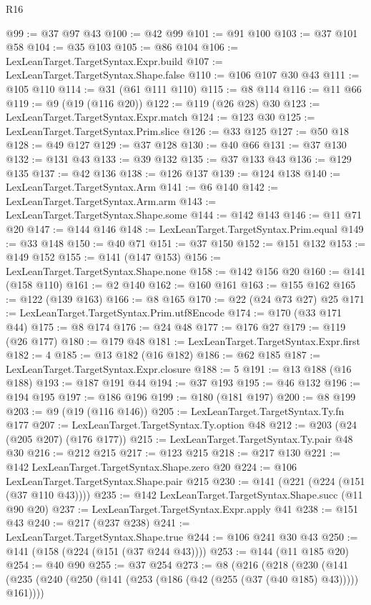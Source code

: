 \begin{lexlean}{R16}
\begin{coremodule}
@99 := @37 @97 @43
@100 := @42 @99
@101 := @91 @100
@103 := @37 @101 @58
@104 := @35 @103
@105 := @86 @104
@106 := LexLeanTarget.TargetSyntax.Expr.build
@107 := LexLeanTarget.TargetSyntax.Shape.false
@110 := @106 @107 @30 @43
@111 := @105 @110
@114 := @31 (@61 @111 @110)
@115 := @8 @114
@116 := @11 @66
@119 := @9 (@19 (@116 @20))
@122 := @119 (@26 @28) @30
@123 := LexLeanTarget.TargetSyntax.Expr.match
@124 := @123 @30
@125 := LexLeanTarget.TargetSyntax.Prim.slice
@126 := @33 @125
@127 := @50 @18
@128 := @49 @127
@129 := @37 @128
@130 := @40 @66
@131 := @37 @130
@132 := @131 @43
@133 := @39 @132
@135 := @37 @133 @43
@136 := @129 @135
@137 := @42 @136
@138 := @126 @137
@139 := @124 @138
@140 := LexLeanTarget.TargetSyntax.Arm
@141 := @6 @140
@142 := LexLeanTarget.TargetSyntax.Arm.arm
@143 := LexLeanTarget.TargetSyntax.Shape.some
@144 := @142 @143
@146 := @11 @71 @20
@147 := @144 @146
@148 := LexLeanTarget.TargetSyntax.Prim.equal
@149 := @33 @148
@150 := @40 @71
@151 := @37 @150
@152 := @151 @132
@153 := @149 @152
@155 := @141 (@147 @153)
@156 := LexLeanTarget.TargetSyntax.Shape.none
@158 := @142 @156 @20
@160 := @141 (@158 @110)
@161 := @2 @140
@162 := @160 @161
@163 := @155 @162
@165 := @122 (@139 @163)
@166 := @8 @165
@170 := @22 (@24 @73 @27) @25
@171 := LexLeanTarget.TargetSyntax.Prim.utf8Encode
@174 := @170 (@33 @171 @44)
@175 := @8 @174
@176 := @24 @48
@177 := @176 @27
@179 := @119 (@26 @177)
@180 := @179 @48
@181 := LexLeanTarget.TargetSyntax.Expr.first
@182 := 4
@185 := @13 @182 (@16 @182)
@186 := @62 @185
@187 := LexLeanTarget.TargetSyntax.Expr.closure
@188 := 5
@191 := @13 @188 (@16 @188)
@193 := @187 @191 @44
@194 := @37 @193
@195 := @46 @132
@196 := @194 @195
@197 := @186 @196
@199 := @180 (@181 @197)
@200 := @8 @199
@203 := @9 (@19 (@116 @146))
@205 := LexLeanTarget.TargetSyntax.Ty.fn @177
@207 := LexLeanTarget.TargetSyntax.Ty.option @48
@212 := @203 (@24 (@205 @207) (@176 @177))
@215 := LexLeanTarget.TargetSyntax.Ty.pair @48 @30
@216 := @212 @215
@217 := @123 @215
@218 := @217 @130
@221 := @142 LexLeanTarget.TargetSyntax.Shape.zero @20
@224 := @106 LexLeanTarget.TargetSyntax.Shape.pair @215
@230 := @141 (@221 (@224 (@151 (@37 @110 @43))))
@235 := @142 LexLeanTarget.TargetSyntax.Shape.succ (@11 @90 @20)
@237 := LexLeanTarget.TargetSyntax.Expr.apply @41
@238 := @151 @43
@240 := @217 (@237 @238)
@241 := LexLeanTarget.TargetSyntax.Shape.true
@244 := @106 @241 @30 @43
@250 := @141 (@158 (@224 (@151 (@37 @244 @43))))
@253 := @144 (@11 @185 @20)
@254 := @40 @90
@255 := @37 @254
@273 := @8
    (@216
      (@218
        (@230
          (@141
            (@235 (@240 (@250 (@141 (@253 (@186 (@42 (@255 (@37 (@40 @185) @43))))) @161))))

\end{coremodule}
\end{lexlean}
